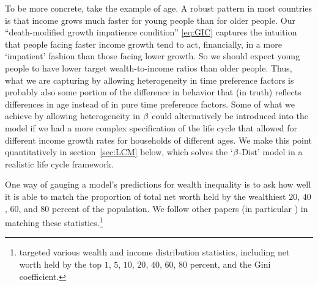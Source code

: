 \documentclass[12pt,titlepage]{econtex}
\begin{document}
To be more concrete, take the example of age.  A robust pattern in
most countries is that income grows much faster for young people than
for older people.  Our ``death-modified growth impatience condition'' \eqref{eq:GIC}
captures the intuition that people facing faster income growth tend to
act, financially, in a more `impatient' fashion than those facing
lower growth.  So we should expect young people to have lower target
wealth-to-income ratios than older people.  Thus, what we are
capturing by allowing heterogeneity in time preference factors is
probably also some portion of the difference in behavior that (in
truth) reflects differences in age instead of in pure time preference
factors.  Some of what we achieve by allowing heterogeneity in
$\beta$ could alternatively be introduced into the model if we had
a more complex specification of the life cycle that allowed for
different income growth rates for households of different ages. We make this point quantitatively
in section~\ref{sec:LCM} below, which solves the `$\beta$-Dist' model in a realistic life cycle framework.

One way of gauging a model's predictions for wealth inequality is to
ask how well it is able to match the proportion of total net worth held
by the wealthiest $20$, $40$, $60$, and $80$ percent of the population.
We follow other papers (in particular \citet{castaneda}) in matching
these statistics.\footnote{\citet{castaneda} targeted various wealth and income
  distribution statistics, including net worth held by the top $1$, $5$, $10$, $20$,
  $40$, $60$, $80$ percent, and the Gini coefficient.}
\end{document}
